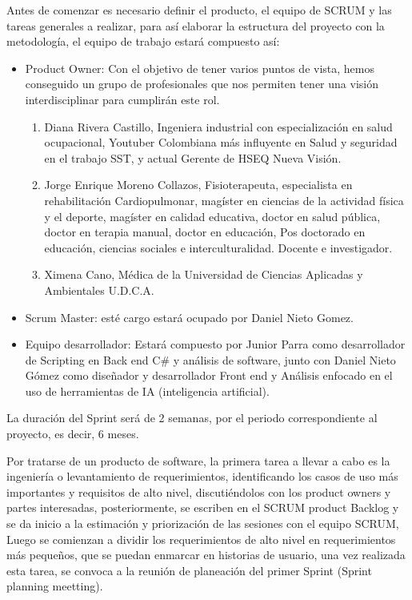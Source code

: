 Antes de comenzar es necesario definir el producto, el equipo de SCRUM y las tareas generales a realizar, para así elaborar la estructura del proyecto con la metodología, el equipo de trabajo estará compuesto así: 
\begin{itemize}
    \item Product Owner:  Con el objetivo de tener varios puntos de vista, hemos conseguido un grupo de profesionales que nos permiten tener una visión interdisciplinar para cumplirán este rol.
    \begin{enumerate}
        \item Diana Rivera Castillo, Ingeniera industrial con especialización en salud ocupacional, Youtuber Colombiana más influyente en Salud y seguridad en el trabajo SST, y actual Gerente de HSEQ Nueva Visión.
        \item Jorge Enrique Moreno Collazos, Fisioterapeuta, especialista en rehabilitación Cardiopulmonar, magíster en ciencias de la actividad física y el deporte, magíster en calidad educativa, doctor en salud pública, doctor en terapia manual, doctor en educación, Pos doctorado en educación, ciencias sociales e interculturalidad. Docente e investigador.
        \item Ximena Cano, Médica de la Universidad de Ciencias Aplicadas y Ambientales U.D.C.A. 
    \end{enumerate}

\item Scrum Master: esté cargo estará ocupado por Daniel Nieto Gomez.
\item Equipo desarrollador: Estará compuesto por Junior Parra como desarrollador de Scripting en Back end C\# y análisis de software, junto con Daniel Nieto Gómez como diseñador y desarrollador Front end y Análisis enfocado en el uso de herramientas de IA (inteligencia artificial). 
\end{itemize}

La duración del Sprint será de 2 semanas, por el periodo correspondiente al proyecto, es decir, 6 meses.

Por tratarse de un producto de software, la primera tarea a llevar a cabo es la ingeniería o levantamiento de requerimientos, identificando los casos de uso más importantes y requisitos de alto nivel, discutiéndolos con los product owners y  partes interesadas, posteriormente, se escriben en el SCRUM product Backlog y se da inicio a la estimación y priorización de las sesiones con el equipo SCRUM, Luego se comienzan a dividir los requerimientos de alto nivel en requerimientos más pequeños, que se puedan enmarcar en historias de usuario, una vez realizada esta tarea, se convoca a la reunión de planeación del primer Sprint (Sprint planning meetting).


